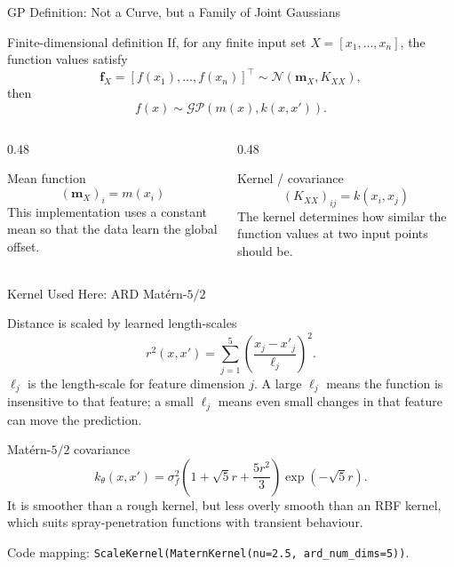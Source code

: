 \documentclass[aspectratio=169,11pt]{beamer}
\begin{document}
\begin{frame}{GP Definition: Not a Curve, but a Family of Joint Gaussians}
\small
\begin{block}{Finite-dimensional definition}
\footnotesize
If, for any finite input set \(X=[x_1,\ldots,x_n]\), the function values satisfy
\[
\mathbf f_X=[f(x_1),\ldots,f(x_n)]^\top
\sim
\mathcal N(\mathbf m_X,K_{XX}),
\]
then
\[
f(x)\sim\mathcal{GP}(m(x),k(x,x')).
\]
\end{block}

\begin{columns}[T,onlytextwidth]
\begin{column}{0.48\linewidth}
\begin{block}{Mean function}
\footnotesize
\[
(\mathbf m_X)_i=m(x_i)
\]
This implementation uses a constant mean so that the data learn the global offset.
\end{block}
\end{column}
\begin{column}{0.48\linewidth}
\begin{block}{Kernel / covariance}
\footnotesize
\[
(K_{XX})_{ij}=k(x_i,x_j)
\]
The kernel determines how similar the function values at two input points should be.
\end{block}
\end{column}
\end{columns}
\end{frame}

\begin{frame}{Kernel Used Here: ARD Mat\'ern-\(5/2\)}
\small
\begin{block}{Distance is scaled by learned length-scales}
\footnotesize
\[
r^2(x,x')=\sum_{j=1}^{5}\left(\frac{x_j-x'_j}{\ell_j}\right)^2.
\]
\(\ell_j\) is the length-scale for feature dimension \(j\). A large \(\ell_j\) means the function is insensitive to
that feature; a small \(\ell_j\) means even small changes in that feature can move the prediction.
\end{block}

\begin{block}{Mat\'ern-\(5/2\) covariance}
\footnotesize
\[
k_\theta(x,x')=\sigma_f^2
\left(1+\sqrt{5}r+\frac{5r^2}{3}\right)\exp(-\sqrt{5}r).
\]
It is smoother than a rough kernel, but less overly smooth than an RBF kernel, which suits spray-penetration
functions with transient behaviour.
\end{block}

\vspace{-0.2em}
\footnotesize
Code mapping: \texttt{ScaleKernel(MaternKernel(nu=2.5, ard\_num\_dims=5))}.
\end{frame}
\end{document}
